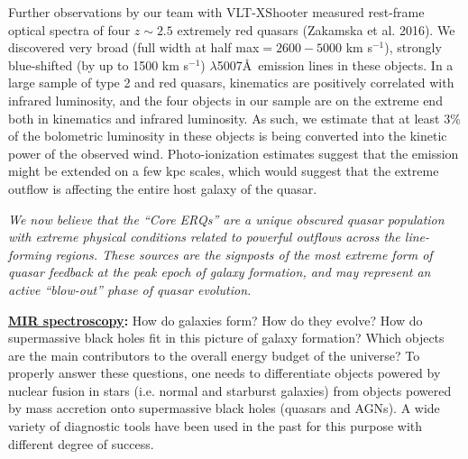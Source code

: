 \smallskip
\smallskip
\noindent
Further observations by our team with VLT-XShooter measured rest-frame
optical spectra of four $z\sim 2.5$ extremely red quasars (Zakamska et al. 2016).  
We discovered very broad (full width at half max$= 2600-5000$ km
s$^{-1}$), strongly blue-shifted (by up to 1500 km s$^{-1}$)
\oiii$\lambda$5007\AA\ emission lines in these objects. In a large
sample of type 2 and red quasars, \oiii kinematics are positively
correlated with infrared luminosity, and the four objects in our
sample are on the extreme end both in \oiii kinematics and infrared
luminosity.
As such, we estimate that at least 3\% of the bolometric luminosity in
these objects is being converted into the kinetic power of the
observed wind. Photo-ionization estimates suggest that the \oiii
emission might be extended on a few kpc scales, which would suggest
that the extreme outflow is affecting the entire host galaxy of the
quasar.

\smallskip
\smallskip
\noindent
{\it We now believe that the ``Core ERQs'' are a unique obscured quasar population
with extreme physical conditions related to powerful outflows across
the line-forming regions. These sources are the signposts of the most extreme form of
quasar feedback at the peak epoch of galaxy formation, and may
represent an active ``blow-out'' phase of quasar evolution. 
}


\medskip
\medskip
\smallskip
\smallskip
\noindent
{\bf \underline{MIR spectroscopy}:}
How do galaxies form? How do they evolve? How do supermassive black holes fit in this picture of galaxy formation? Which objects are the main contributors to the overall energy budget of the universe? To properly answer these questions, one needs to differentiate objects powered by nuclear fusion in stars (i.e. normal and starburst galaxies) from objects powered by mass accretion onto supermassive black holes (quasars and AGNs). A wide variety of diagnostic tools have been used in the past for this purpose with different degree of success.

